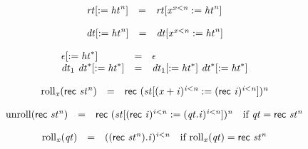 \vspace{1ex}

$$
\begin{array}{@{}lcl@{}l@{}}
{{\mathit{rt}}}{{}[{ := }\;{{\mathit{ht}}^{{\mathit{n}}}}]} &=& {{\mathit{rt}}}{{}[{{\mathit{x}}^{{\mathit{x}}<{\mathit{n}}}} := {{\mathit{ht}}^{{\mathit{n}}}}]} &  \\
\end{array}
$$

$$
\begin{array}{@{}lcl@{}l@{}}
{{\mathit{dt}}}{{}[{ := }\;{{\mathit{ht}}^{{\mathit{n}}}}]} &=& {{\mathit{dt}}}{{}[{{\mathit{x}}^{{\mathit{x}}<{\mathit{n}}}} := {{\mathit{ht}}^{{\mathit{n}}}}]} &  \\
\end{array}
$$

$$
\begin{array}{@{}lcl@{}l@{}}
{\epsilon}{{}[{ := }\;{{\mathit{ht}}^\ast}]} &=& \epsilon &  \\
{{\mathit{dt}}_{{1}}~{{\mathit{dt}}^\ast}}{{}[{ := }\;{{\mathit{ht}}^\ast}]} &=& {{\mathit{dt}}_{{1}}}{{}[{ := }\;{{\mathit{ht}}^\ast}]}~{{{\mathit{dt}}^\ast}}{{}[{ := }\;{{\mathit{ht}}^\ast}]} &  \\
\end{array}
$$

\vspace{1ex}

$$
\begin{array}{@{}lcl@{}l@{}}
{{\mathrm{roll}}}_{{\mathit{x}}}(\mathsf{rec}~{{\mathit{st}}^{{\mathit{n}}}}) &=& \mathsf{rec}~{({{\mathit{st}}}{{}[{({\mathit{x}} + {\mathit{i}})^{{\mathit{i}}<{\mathit{n}}}} := {(\mathsf{rec}~{\mathit{i}})^{{\mathit{i}}<{\mathit{n}}}}]})^{{\mathit{n}}}} &  \\
\end{array}
$$

$$
\begin{array}{@{}lcl@{}l@{}}
{\mathrm{unroll}}(\mathsf{rec}~{{\mathit{st}}^{{\mathit{n}}}}) &=& \mathsf{rec}~{({{\mathit{st}}}{{}[{(\mathsf{rec}~{\mathit{i}})^{{\mathit{i}}<{\mathit{n}}}} := {({\mathit{qt}} . {\mathit{i}})^{{\mathit{i}}<{\mathit{n}}}}]})^{{\mathit{n}}}} &\quad
  \mbox{if}~{\mathit{qt}} = \mathsf{rec}~{{\mathit{st}}^{{\mathit{n}}}} \\
\end{array}
$$

$$
\begin{array}{@{}lcl@{}l@{}}
{{\mathrm{roll}}}_{{\mathit{x}}}({\mathit{qt}}) &=& {((\mathsf{rec}~{{\mathit{st}}^{{\mathit{n}}}}) . {\mathit{i}})^{{\mathit{i}}<{\mathit{n}}}} &\quad
  \mbox{if}~{{\mathrm{roll}}}_{{\mathit{x}}}({\mathit{qt}}) = \mathsf{rec}~{{\mathit{st}}^{{\mathit{n}}}} \\
\end{array}
$$

